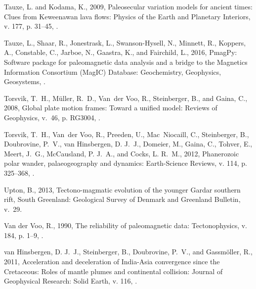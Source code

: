\documentclass[11pt,letterpaper]{article}
\begin{document}
\begin{thebibliography}{153}
Tauxe, L. and Kodama, K., 2009, Paleosecular variation models for ancient
  times: Clues from {K}eweenawan lava flows: Physics of the Earth and Planetary
  Interiors, v. 177, p. 31--45, .

Tauxe, L., Shaar, R., Jonestrask, L., Swanson-Hysell, N., Minnett, R., Koppers,
  A., Constable, C., Jarboe, N., Gaastra, K., and Fairchild, L., 2016, {PmagPy:
  Software package for paleomagnetic data analysis and a bridge to the
  Magnetics Information Consortium (MagIC) Database}: Geochemistry, Geophysics,
  Geosystems, .

Torsvik, T.~H., M{\"u}ller, R.~D., Van~der Voo, R., Steinberger, B., and Gaina,
  C., 2008, Global plate motion frames: Toward a unified model: Reviews of
  Geophysics, v.~46, p. RG3004, .

Torsvik, T.~H., Van~der Voo, R., Preeden, U., Mac~Niocaill, C., Steinberger,
  B., Doubrovine, P.~V., van Hinsbergen, D. J.~J., Domeier, M., Gaina, C.,
  Tohver, E., Meert, J.~G., McCausland, P. J.~A., and Cocks, L. R.~M., 2012,
  Phanerozoic polar wander, palaeogeography and dynamics: Earth-Science
  Reviews, v. 114, p. 325--368, .

Upton, B., 2013, {Tectono-magmatic evolution of the younger Gardar southern
  rift, South Greenland}: Geological Survey of Denmark and Greenland Bulletin,
  v.~29.

{Van der Voo}, R., 1990, The reliability of paleomagnetic data: Tectonophysics,
  v. 184, p. 1--9, .

van Hinsbergen, D. J.~J., Steinberger, B., Doubrovine, P.~V., and
  Gassm{\"o}ller, R., 2011, {Acceleration and deceleration of India-Asia
  convergence since the Cretaceous: Roles of mantle plumes and continental
  collision}: Journal of Geophysical Research: Solid Earth, v. 116,
  .


\end{thebibliography}
\end{document}
